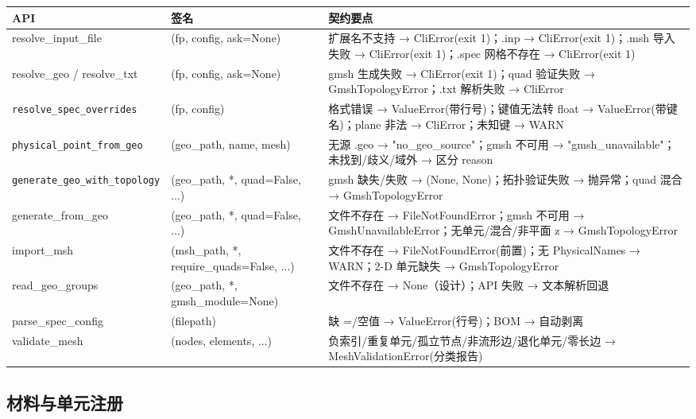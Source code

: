 \documentclass[12pt,a4paper]{ctexart}
\begin{document}
\begin{longtable}{p{4.2cm}p{4.0cm}p{6.0cm}}
\toprule
\textbf{API} & \textbf{签名} & \textbf{契约要点} \\
\midrule
resolve\_input\_file & (fp, config, ask=None) & 扩展名不支持 → CliError(exit 1)；.inp → CliError(exit 1)；.msh 导入失败 → CliError(exit 1)；.spec 网格不存在 → CliError(exit 1) \\
resolve\_geo / resolve\_txt & (fp, config, ask=None) & gmsh 生成失败 → CliError(exit 1)；quad 验证失败 → GmshTopologyError；.txt 解析失败 → CliError \\
\texttt{resolve\_spec\_\newline overrides} & (fp, config) & 格式错误 → ValueError(带行号)；键值无法转 float → ValueError(带键名)；plane 非法 → CliError；未知键 → WARN \\
\texttt{physical\_point\_\newline from\_geo} & (geo\_path, name, mesh) & 无源 .geo → "no\_geo\_source"；gmsh 不可用 → "gmsh\_unavailable"；未找到/歧义/域外 → 区分 reason \\
\texttt{generate\_geo\_with\_\-topology} & (geo\_path, *, quad=False, ...) & gmsh 缺失/失败 → (None, None)；拓扑验证失败 → 抛异常；quad 混合 → GmshTopologyError \\
generate\_from\_geo & (geo\_path, *, quad=False, ...) & 文件不存在 → FileNotFoundError；gmsh 不可用 → GmshUnavailableError；无单元/混合/非平面 z → GmshTopologyError \\
import\_msh & (msh\_path, *, require\_quads=False, ...) & 文件不存在 → FileNotFoundError(前置)；无 PhysicalNames → WARN；2-D 单元缺失 → GmshTopologyError \\
read\_geo\_groups & (geo\_path, *, gmsh\_module=None) & 文件不存在 → None（设计）；API 失败 → 文本解析回退 \\
parse\_spec\_config & (filepath) & 缺 =/空值 → ValueError(行号)；BOM → 自动剥离 \\
validate\_mesh & (nodes, elements, ...) & 负索引/重复单元/孤立节点/非流形边/退化单元/零长边 → MeshValidationError(分类报告) \\
\bottomrule
\end{longtable}

\subsection{材料与单元注册}
\end{document}
